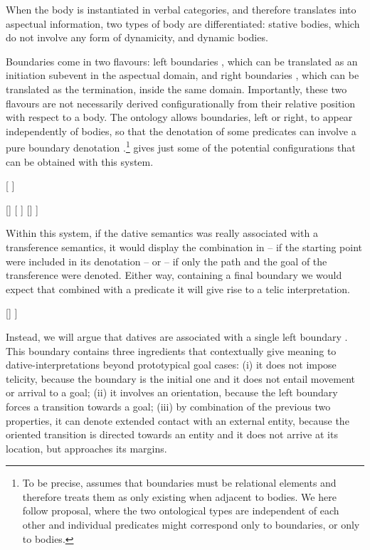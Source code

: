 \documentclass[output=paper,colorlinks,citecolor=brown,nonflat]{./langscibook}
\begin{document}
When the body is instantiated in verbal categories, and therefore translates into aspectual information, two types of body are differentiated: stative bodies, which do not involve any form of dynamicity, and dynamic bodies. 

Boundaries come in two flavours: left boundaries , which can be translated as an initiation subevent in the aspectual domain, and right boundaries , which can be translated as the termination, inside the same domain. Importantly, these two flavours are not necessarily derived configurationally from their relative position with respect to a body. The ontology allows boundaries, left or right, to appear independently of bodies, so that the denotation of some predicates can involve a pure boundary denotation \citep{MarínMcNally2011}.\footnote{To be precise, \citet{Piñón1997} assumes that boundaries must be relational elements and therefore treats them as only existing when adjacent to bodies. We here follow  proposal, where the two ontological types are independent of each other and individual predicates might correspond only to boundaries, or only to bodies.}  gives just some of the potential configurations that can be obtained with this system.

\ea%
    \label{ex:fabregas:14}
    \ea\label{ex:fabregas:14a}{}
    [
    \ex\label{ex:fabregas:14b}{}
    ]
    \z
\z

\ea%
    \label{ex:fabregas:15}
    \ea\label{ex:fabregas:15a}{}
    [{\midline}]
    \ex\label{ex:fabregas:15b}{}
    [{\midline}
    \ex\label{ex:fabregas:15c}{}
    ]{\midline}
    \ex\label{ex:fabregas:15d}{}
    []
    \ex\label{ex:fabregas:15e}{}
    ]
    \z
\z

Within this system, if the dative semantics was really associated with a transference semantics, it would display the combination in  – if the starting point were included in its denotation – or  – if only the path and the goal of the transference were denoted. Either way, containing a final boundary we would expect that combined with a predicate it will give rise to a telic interpretation.

\ea%
    \label{ex:fabregas:16}
    \ea\label{ex:fabregas:16a}{}
    [{\midline}]
    \ex\label{ex:fabregas:16b}{}
    {\midline}]
    \z
\z

Instead, we will argue that datives are associated with a single left boundary . This boundary contains three ingredients that contextually give meaning to dative-interpretations beyond prototypical goal cases: (i) it does not impose telicity, because the boundary is the initial one and it does not entail movement or arrival to a goal; (ii) it involves an orientation, because the left boundary forces a transition towards a goal; (iii) by combination of the previous two properties, it can denote extended contact with an external entity, because the oriented transition is directed towards an entity and it does not arrive at its location, but approaches its margins.
 
\end{document}
